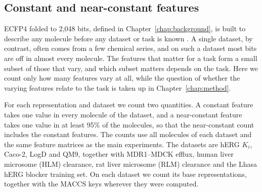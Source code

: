 

\subsection{Constant and near-constant features}\label{sec:flaws:constant} %
ECFP4 folded to 2,048 bits, defined in Chapter~\ref{chap:background}, is built to describe any molecule before any dataset or task is known \citep{rogers2010}. A single dataset, by contrast, often comes from a few chemical series, and on such a dataset most bits are off in almost every molecule. The features that matter for a task form a small subset of those that vary, and which subset matters depends on the task. Here we count only how many features vary at all, while the question of whether the varying features relate to the task is taken up in Chapter~\ref{chap:method}.

For each representation and dataset we count two quantities. A constant feature takes one value in every molecule of the dataset, and a near-constant feature takes one value in at least 95\% of the molecules, so that the near-constant count includes the constant features. The counts use all molecules of each dataset and the same feature matrices as the main experiments. The datasets are hERG $K_i$, Caco-2, LogD and QM9, together with MDR1--MDCK efflux, human liver microsome (HLM) clearance, rat liver microsome (RLM) clearance and the Lhasa hERG blocker training set. On each dataset we count its base representations, together with the MACCS keys wherever they were computed.

